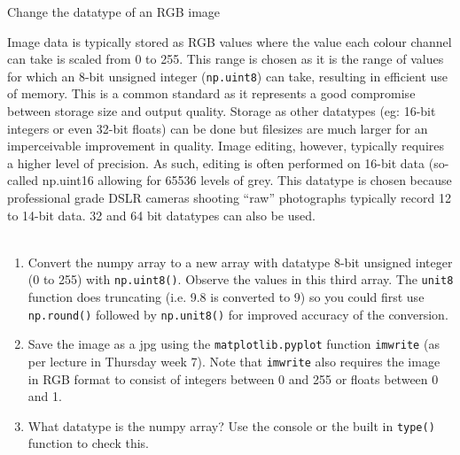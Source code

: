 \documentclass{lab}
\begin{document}
\begin{task}{Change the datatype of an RGB image}{}

Image data is typically stored as RGB values where the value each colour channel can take is scaled from 0 to 255. This range is chosen as it is the range of values for which an 8-bit unsigned integer (\texttt{np.uint8}) can take, resulting in eﬃcient use of memory. This is a common standard as it represents a good compromise between storage size and output quality. Storage as other datatypes (eg: 16-bit integers or even 32-bit ﬂoats) can be done but ﬁlesizes are much larger for an imperceivable improvement in quality.
Image editing, however, typically requires a higher level of precision. As such, editing is often performed on 16-bit data (so-called np.uint16 allowing for 65536 levels of grey. This datatype is chosen because professional grade DSLR cameras shooting “raw” photographs typically record 12 to 14-bit data. 32 and 64 bit datatypes can also be used. \\~

\begin{enumerate}
\item Convert the numpy array to a new array with datatype 8-bit unsigned integer (0 to 255) with \texttt{np.uint8()}. Observe the values in this third array. The \texttt{unit8} function does truncating (i.e. 9.8 is converted to 9) so you could first use \texttt{np.round()} followed by \texttt{np.unit8()} for improved accuracy of the conversion.
\item Save the image as a jpg using the \texttt{matplotlib.pyplot} function \texttt{imwrite} (as per lecture in Thursday week 7). Note that \texttt{imwrite} also requires the image in RGB format to consist of integers between 0 and 255 or floats between 0 and 1. 
\item 	What datatype is the numpy array? Use the console or the built in \texttt{type()} function to check this.
\end{enumerate}

\end{task}
\end{document}
